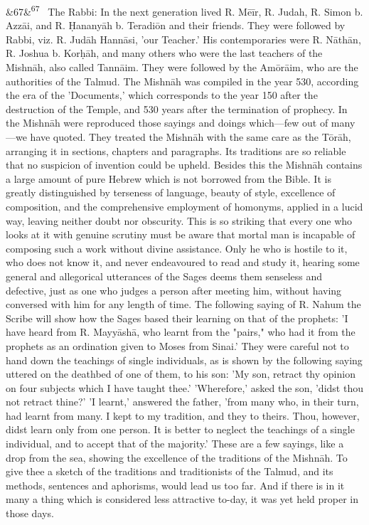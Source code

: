 \documentclass[12pt]{article}
\newcommand{\para}[1][]{\par\noindent\ifx&#1&\else\textsuperscript{\footnotesize #1}~\fi}
\begin{document}
\para[67] The Rabbi: In the next generation lived R. Mēīr, R. Judah, R. Simon b. Azzāi, and R. Ḥananyāh b. Teradiōn and their friends. They were followed by Rabbi, viz. R. Judāh Hannāsi, 'our Teacher.' His contemporaries were R. Nāthān, R. Joshua b. Korḥāh, and many others who were the last teachers of the Mishnāh, also called Tannāim. They were followed by the Amōrāim, who are the authorities of the Talmud. The Mishnāh was compiled in the year 530, according the era of the 'Documents,' which corresponds to the year 150 after the destruction of the Temple, and 530 years after the termination of prophecy. In the Mishnāh were reproduced those sayings and doings which---few out of many---we have quoted. They treated the Mishnāh with the same care as the Tōrāh, arranging it in sections, chapters and paragraphs. Its traditions are so reliable that no suspicion of invention could be upheld. Besides this the Mishnāh contains a large amount of pure Hebrew which is not borrowed from the Bible. It is greatly distinguished by terseness of language, beauty of style, excellence of composition, and the comprehensive employment of homonyms, applied in a lucid way, leaving neither doubt nor obscurity. This is so striking that every one who looks at it with genuine scrutiny must be aware that mortal man is incapable of composing such a work without divine assistance. Only he who is hostile to it, who does not know it, and never endeavoured to read and study it, hearing some general and allegorical utterances of the Sages deems them senseless and defective, just as one who judges a person after meeting him, without having conversed with him for any length of time. The following saying of R. Nahum the Scribe will show how the Sages based their learning on that of the prophets: 'I have heard from R. Mayyāshā, who learnt from the "pairs," who had it from the prophets as an ordination given to Moses from Sinai.' They were careful not to hand down the teachings of single individuals, as is shown by the following saying uttered on the deathbed of one of them, to his son: 'My son, retract thy opinion on four subjects which I have taught thee.' 'Wherefore,' asked the son, 'didst thou not retract thine?' 'I learnt,' answered the father, 'from many who, in their turn, had learnt from many. I kept to my tradition, and they to theirs. Thou, however, didst learn only from one person. It is better to neglect the teachings of a single individual, and to accept that of the majority.' These are a few sayings, like a drop from the sea, showing the excellence of the traditions of the Mishnāh. To give thee a sketch of the traditions and traditionists of the Talmud, and its methods, sentences and aphorisms, would lead us too far. And if there is in it many a thing which is considered less attractive to-day, it was yet held proper in those days.
\end{document}
